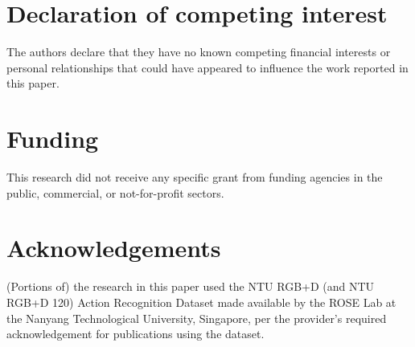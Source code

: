 \documentclass[a4paper,fleqn]{cas-sc}
\begin{document}



\printcredits %

\section*{Declaration of competing interest}
The authors declare that they have no known competing financial interests or personal relationships that could have appeared to influence the work reported in this paper.

\section*{Funding}
This research did not receive any specific grant from funding agencies in the public, commercial, or not-for-profit sectors.

\section*{Acknowledgements}
(Portions of) the research in this paper used the NTU RGB+D (and NTU RGB+D 120) Action Recognition Dataset made available by the ROSE Lab at the Nanyang Technological University, Singapore, per the provider's required acknowledgement for publications using the dataset.
\end{document}
